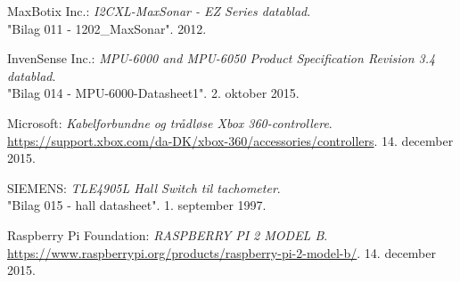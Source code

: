 \begin{thebibliography}{2}
 MaxBotix Inc.: \textit{I2CXL-MaxSonar - EZ Series datablad}. \\
"Bilag 011 - 1202\_MaxSonar". 2012.

 InvenSense Inc.: \textit{MPU-6000 and MPU-6050 Product Specification Revision 3.4 datablad}. \\
"Bilag 014 - MPU-6000-Datasheet1". 2. oktober 2015.

 Microsoft: \textit{Kabelforbundne og trådløse Xbox 360-controllere}. \\
\url{https://support.xbox.com/da-DK/xbox-360/accessories/controllers}. 14. december 2015.

 SIEMENS: \textit{TLE4905L Hall Switch til tachometer}. \\
"Bilag 015 - hall datasheet". 1. september 1997.

 Raspberry Pi Foundation: \textit{RASPBERRY PI 2 MODEL B}. \\
\url{https://www.raspberrypi.org/products/raspberry-pi-2-model-b/}. 14. december 2015.

\end{thebibliography}